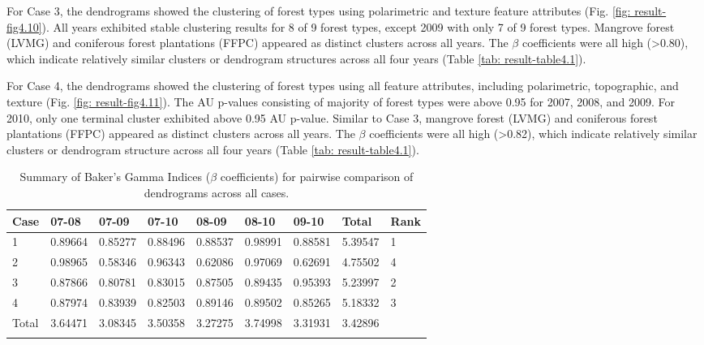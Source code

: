 For Case 3, the dendrograms showed the clustering of forest types using polarimetric and texture feature attributes (Fig. \ref{fig: result-fig4.10}). All years exhibited stable clustering results for 8 of 9 forest types, except 2009 with only 7 of 9 forest types. Mangrove forest (LVMG) and coniferous forest plantations (FFPC) appeared as distinct clusters across all years. The $\beta$  coefficients were all high (\textgreater0.80), which indicate relatively similar clusters or dendrogram structures across all four years (Table \ref{tab: result-table4.1}).

For Case 4, the dendrograms showed the clustering of forest types using all feature attributes, including polarimetric, topographic, and texture (Fig. \ref{fig: result-fig4.11}). The AU p-values consisting of majority of forest types were above 0.95 for 2007, 2008, and 2009. For 2010, only one terminal cluster exhibited above 0.95 AU p-value. Similar to Case 3, mangrove forest (LVMG) and coniferous forest plantations (FFPC) appeared as distinct clusters across all years. The $\beta$ coefficients were all high (\textgreater0.82), which indicate relatively similar clusters or dendrogram structure across all four years (Table \ref{tab: result-table4.1}).\\

\begin{spacing}{1.0}
\begin{longtable}[h!]{ p{1cm} p{1.4cm} p{1.4cm} p{1.4cm} p{1.4cm} p{1.4cm} p{1.4cm} p{1.4cm} p{0.9cm} }

    \caption[Summary of Baker's Gamma Indices ($\beta$ coefficients) for pairwise comparison of dendrograms across all cases.]{Summary of Baker's Gamma Indices ($\beta$ coefficients) for pairwise comparison of dendrograms across all cases.}
    \label{tab: result-table4.2}\\
    
    	\toprule
    	Case & {} 07-08 & 07-09 & 07-10 & 08-09 & 08-10 & 09-10 & Total & Rank\\
    	\midrule
    	\endhead
    	
		1 & 0.89664 & 0.85277 & 0.88496 & 0.88537 & 0.98991 & 0.88581 & 5.39547 & 1\\
		2 & 0.98965 & 0.58346 & 0.96343 & 0.62086 & 0.97069 & 0.62691 & 4.75502 & 4\\
		3 & 0.87866 & 0.80781 & 0.83015 & 0.87505 & 0.89435 & 0.95393 & 5.23997 & 2\\
		4 & 0.87974 & 0.83939 & 0.82503 & 0.89146 & 0.89502 & 0.85265 & 5.18332 & 3\\
		\cmidrule{1-9}
		Total & 3.64471 & 3.08345 & 3.50358 & 3.27275 & 3.74998 & 3.31931 & 3.42896 & {}\\
				
		\bottomrule \\
    
\end{longtable}
\end{spacing}

